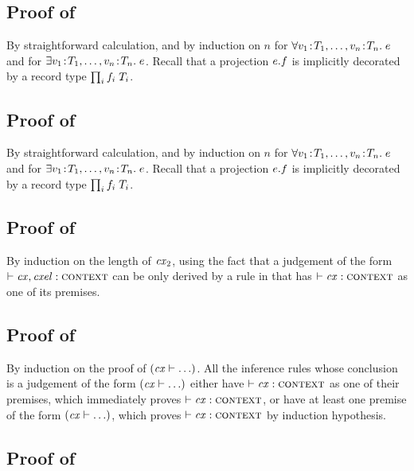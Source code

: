 \subsection*{Proof of }

By straightforward calculation, and by induction on $n$ for
$\forall v_1\!:\!T_1,\ldots,v_n\!:\!T_n.\;e$ and for
$\exists v_1\!:\!T_1,\ldots,v_n\!:\!T_n.\;e$. Recall that
a projection $e.f$ is implicitly decorated by a record type $\prod_{i}f_i\;T_i$.



\subsection*{Proof of }

By straightforward calculation, and by induction on $n$ for
$\forall v_1\!:\!T_1,\ldots,v_n\!:\!T_n.\;e$ and for
$\exists v_1\!:\!T_1,\ldots,v_n\!:\!T_n.\;e$. Recall that
a projection $e.f$ is implicitly decorated by a record type $\prod_{i}f_i\;T_i$.



\subsection*{Proof of }

By induction on the length of $\mathit{cx}_2$, using the fact that a judgement of the
form $\vdash\mathit{cx},\mathit{cxel}:\textsc{context}$ can be only derived by a rule in
 that has $\vdash\mathit{cx}:\textsc{context}$ as one of its premises.



\subsection*{Proof of }

By induction on the proof of $(\mathit{cx}\vdash\ldots)$. All the inference rules whose
conclusion is a judgement of the form $(\mathit{cx}\vdash\ldots)$ either have $\vdash\mathit{cx}:\textsc{context}$
as one of their premises, which immediately proves $\vdash\mathit{cx}:\textsc{context}$, or have at least
one premise of the form $(\mathit{cx}\vdash\ldots)$, which proves $\vdash\mathit{cx}:\textsc{context}$ by induction
hypothesis.



\subsection*{Proof of }

